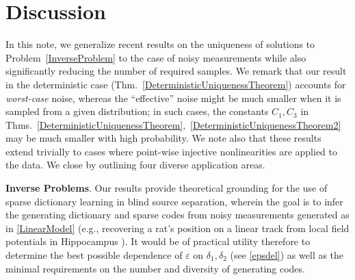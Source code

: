 \documentclass[9pt,twocolumn]{pnas-new}
\begin{document}
\section{Discussion}\label{Discussion}

In this note, we generalize recent results \cite{Hillar15} on the uniqueness of solutions to Problem~\ref{InverseProblem} to the case of noisy measurements while also significantly reducing the number of required samples.
We remark that our result in the deterministic case (Thm.~\ref{DeterministicUniquenessTheorem}) accounts for \emph{worst-case} noise, whereas the ``effective'' noise might be much smaller when it is sampled from a given distribution; in such cases, the constants $C_1, C_3$ in Thms.~\ref{DeterministicUniquenessTheorem},~\ref{DeterministicUniquenessTheorem2} may be much smaller with high probability.
We note also that these results extend trivially to cases where point-wise injective nonlinearities are applied to the data. We close by outlining four diverse application areas.

\textbf{Inverse Problems}.  
Our results provide theoretical grounding for the use of sparse dictionary learning in blind source separation, wherein the goal is to infer the generating dictionary and sparse codes from noisy measurements generated as in \eqref{LinearModel} (e.g., recovering a rat's position on a linear track from local field potentials in Hippocampus \cite{Agarwal14}). It would be of practical utility therefore to determine the best possible dependence of $\varepsilon$ on $\delta_1, \delta_2$ (see \eqref{epsdel}) as well as the minimal requirements on the number and diversity of generating codes. %
\end{document}
